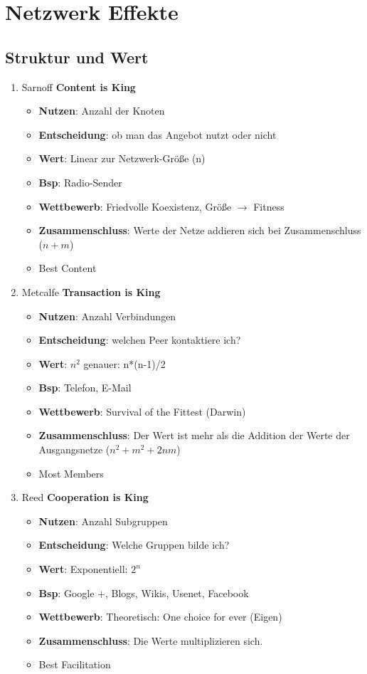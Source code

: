 \documentclass{article} %
\begin{document}
	
	\section{Netzwerk Effekte}	
	\subsection{Struktur und Wert}
	\begin{enumerate}
		\item Sarnoff \textbf{Content is King}
		\begin{itemize}
			\item \textbf{Nutzen}: Anzahl der Knoten
			\item \textbf{Entscheidung}: ob man das Angebot nutzt oder nicht
			\item \textbf{Wert}: Linear zur Netzwerk-Größe (n)
			\item \textbf{Bsp}: Radio-Sender
			\item \textbf{Wettbewerb}: Friedvolle Koexistenz, Größe $\rightarrow$ Fitness
			\item \textbf{Zusammenschluss}: Werte der Netze addieren sich bei Zusammenschluss ($n + m$)
			\item Best Content
		\end{itemize}
		\item Metcalfe \textbf{Transaction is King}
		\begin{itemize}
			\item \textbf{Nutzen}: Anzahl Verbindungen
			\item \textbf{Entscheidung}: welchen Peer kontaktiere ich?
			\item \textbf{Wert}: $n^2$ genauer: n*(n-1)/2
			\item \textbf{Bsp}: Telefon, E-Mail
			\item \textbf{Wettbewerb}: Survival of the Fittest (Darwin)
			\item \textbf{Zusammenschluss}: Der Wert ist mehr als die Addition der Werte der Ausgangsnetze ($n^2 + m^2 + 2nm$)
			\item Most Members
		\end{itemize}
		\item Reed \textbf{Cooperation is King}
		\begin{itemize}
			\item \textbf{Nutzen}: Anzahl Subgruppen
			\item \textbf{Entscheidung}: Welche Gruppen bilde ich?
			\item \textbf{Wert}: Exponentiell: $2^n$
			\item \textbf{Bsp}: Google +, Blogs, Wikis, Usenet, Facebook
			\item \textbf{Wettbewerb}: Theoretisch: One choice for ever (Eigen)
			\item \textbf{Zusammenschluss}: Die Werte multiplizieren sich.
			\item Best Facilitation
		\end{itemize}
	\end{enumerate}
\end{document}
